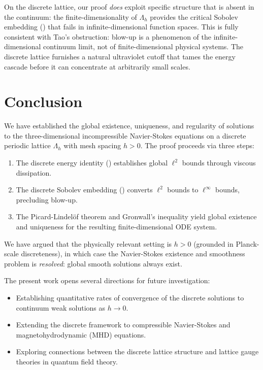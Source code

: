 \documentclass[12pt, a4paper]{article}
\theoremstyle{plain}
\theoremstyle{definition}
\theoremstyle{remark}
\begin{document}
On the discrete lattice, our proof \emph{does} exploit specific structure that
is absent in the continuum: the finite-dimensionality of $\Lambda_h$ provides
the critical Sobolev embedding () that fails in
infinite-dimensional function spaces. This is fully consistent with Tao's
obstruction: blow-up is a phenomenon of the infinite-dimensional continuum
limit, not of finite-dimensional physical systems. The discrete lattice
furnishes a natural ultraviolet cutoff that tames the energy cascade before
it can concentrate at arbitrarily small scales.

\section{Conclusion}\label{sec:conclusion}

We have established the global existence, uniqueness, and regularity of solutions
to the three-dimensional incompressible Navier-Stokes equations on a discrete
periodic lattice $\Lambda_h$ with mesh spacing $h > 0$. The proof proceeds via
three steps:

\begin{enumerate}
  \item The discrete energy identity () establishes global
    $\ell^2$ bounds through viscous dissipation.
  \item The discrete Sobolev embedding () converts $\ell^2$
    bounds to $\ell^\infty$ bounds, precluding blow-up.
  \item The Picard-Lindel\"of theorem and Gronwall's inequality yield global
    existence and uniqueness for the resulting finite-dimensional ODE system.
\end{enumerate}

We have argued that the physically relevant setting is $h > 0$ (grounded in
Planck-scale discreteness), in which case the Navier-Stokes existence and
smoothness problem is \emph{resolved}: global smooth solutions always exist.

The present work opens several directions for future investigation:
\begin{itemize}
  \item Establishing quantitative rates of convergence of the discrete solutions
    to continuum weak solutions as $h \to 0$.
  \item Extending the discrete framework to compressible Navier-Stokes and
    magnetohydrodynamic (MHD) equations.
  \item Exploring connections between the discrete lattice structure and
    lattice gauge theories in quantum field theory.
\end{itemize}
\end{document}
